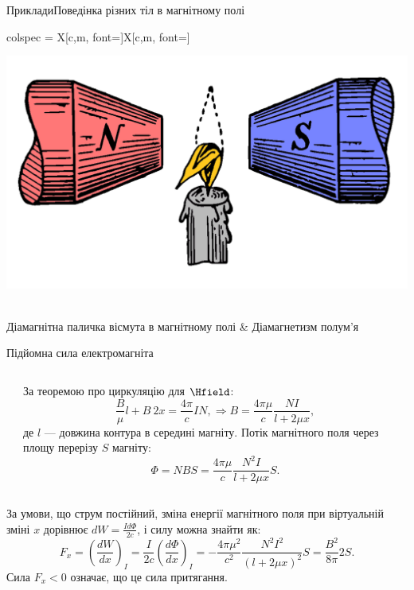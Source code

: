 \documentclass[onlytextwidth]{beamer}
\begin{document}
\begin{frame}{Приклади}{Поведінка різних тіл в магнітному полі}
\begin{tblr}{
		colspec = {X[c,m, font=\small]X[c,m, font=\small]}
		}
		\begin{pict}\includegraphics[width=0.5\linewidth]{Flame_diamagnet}\end{pict}                                                     \\
		Діамагнітна паличка вісмута в магнітному полі                             & Діамагнетизм полум'я
	\end{tblr}
\end{frame}



\begin{frame}{Підйомна сила електромагніта}{}
	\begin{columns}
		\begin{column}{0.3\linewidth}
            
		\end{column}
		\begin{column}{0.69\linewidth}
			\begin{block}{}\justifying
				За теоремою про циркуляцію для $\Hfield$:
				\begin{equation*}
					\frac{B}{\mu} l + B\ 2x = \frac{4\pi}{c} IN, \Rightarrow B = \frac{4\pi\mu}{c} \frac{NI}{l + 2\mu x},
				\end{equation*}
				де $l$ --- довжина контура в середині магніту.
				Потік магнітного поля через площу перерізу $S$ магніту:
				\begin{equation*}
					\Phi = NBS = \frac{4\pi\mu}{c} \frac{N^2I}{l + 2\mu x} S.
				\end{equation*}
			\end{block}
		\end{column}
	\end{columns}
	\begin{block}{}\justifying
		За умови, що струм постійний, зміна енергії магнітного поля при віртуальній зміні $x$ дорівнює $dW = \frac{I d\Phi}{2c}$,
		і силу можна знайти як:
		\begin{equation*}
			F_x =  \left( \frac{d W}{dx} \right)_{I} = \frac{I}{2c} \left( \frac{d \Phi}{dx} \right)_{I} = -\frac{4\pi\mu^2}{c^2}\frac{N^2I^2}{(l + 2\mu
				x)^2} S = \frac{B^2}{8\pi} 2S.
		\end{equation*}Сила $F_x <0 $ означає, що це сила притягання.
	\end{block}
\end{frame}
\end{document}
